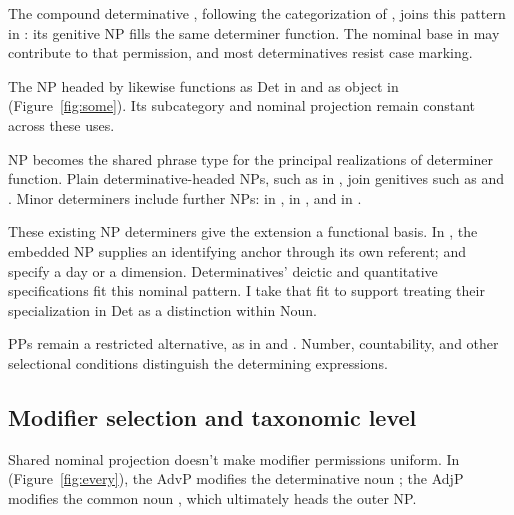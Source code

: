 \documentclass[12pt]{article}
\begin{document}
The compound determinative , following the categorization of \textcite[§1.3]{Payne2007}, joins this pattern in : its genitive NP fills the same determiner function. The nominal base in  may contribute to that permission, and most determinatives resist case marking.

The NP headed by  likewise functions as Det in  and as object in  (Figure~\ref{fig:some}). Its subcategory and nominal projection remain constant across these uses.

NP becomes the shared phrase type for the principal realizations of determiner function. Plain determinative-headed NPs, such as  in , join genitives such as  and . Minor determiners include further NPs:  in ,  in , and  in  \citep[356]{huddleston2002}.

These existing NP determiners give the extension a functional basis. In , the embedded NP supplies an identifying anchor through its own referent;  and  specify a day or a dimension. Determinatives' deictic and quantitative specifications fit this nominal pattern. I take that fit to support treating their specialization in Det as a distinction within Noun.

PPs remain a restricted alternative, as in  and  \citep[356]{huddleston2002}. Number, countability, and other selectional conditions distinguish the determining expressions.

\subsection{Modifier selection and taxonomic level}\label{sec:payne}

Shared nominal projection doesn't make modifier permissions uniform. In  (Figure~\ref{fig:every}), the AdvP  modifies the determinative noun ; the AdjP  modifies the common noun , which ultimately heads the outer NP.
\end{document}
